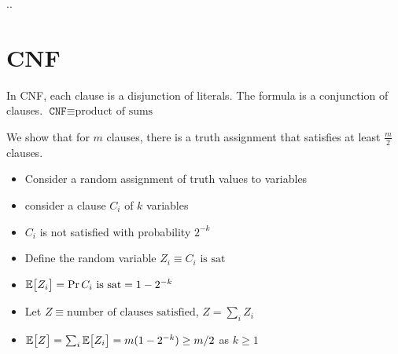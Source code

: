 ..

\section{CNF}

In CNF, each clause is a disjunction of literals. The formula is a conjunction
of clauses. $\texttt{CNF} \equiv \text{product of sums}$


We show that for $m$ clauses, there is a truth assignment that satisfies
at least $\frac{m}{2}$ clauses.

\begin{itemize}
    \item Consider a random assignment of truth values to variables
    \item consider a clause $C_i$ of $k$ variables
    \item $C_i$ is not satisfied with probability $2^{-k}$
    \item Define the random variable $Z_i \equiv \text{$C_i$ is sat}$
    \item $\mathbb{E}\big[ Z_i \big] = \Pr{\text{$C_i$ is sat}} = 1 - 2^{-k}$
    \item Let $Z \equiv \text{number of clauses satisfied}$, $Z = \sum_i Z_i$
    \item $\mathbb{E}\big[ Z \big] = \sum_i \mathbb{E}\big[ Z_i \big] = m(1 - 2^{-k}) \geq m/2$ as $k \geq 1$
\end{itemize}

